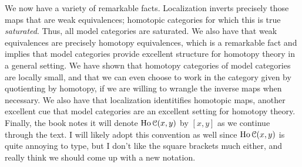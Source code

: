\begin{remark}
	We now have a variety of remarkable facts. Localization inverts precisely those maps that are weak equivalences; homotopic categories for which this is true \emph{saturated}. Thus, all model categories are saturated. We also have that weak equivalences are precisely homotopy equivalences, which is a remarkable fact and implies that model categories provide excellent structure for homotopy theory in a general setting. We have shown that homotopy categories of model categories are locally small, and that we can even choose to work in the category given by quotienting by homotopy, if we are willing to wrangle the inverse maps when necessary. We also have that localization identitifies homotopic maps, another excellent cue that model categories are an excellent setting for homotopy theory. Finally, the book notes it will denote $\operatorname{Ho} \mathcal{C} (x,y)$ by $[x,y]$ as we continue through the text. I will likely adopt this convention as well since $\operatorname{Ho} \mathcal{C} (x,y)$ is quite annoying to type, but I don't like the square brackets much either, and really think we should come up with a new notation.
\end{remark}

